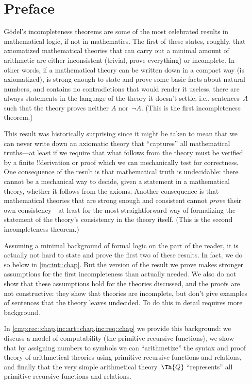 
\chapter{Preface}

G\"odel's incompleteness theorems are some of the most celebrated
results in mathematical logic, if not in mathematics. The first of
these states, roughly, that axiomatized mathematical theories that can
carry out a minimal amount of arithmetic are either inconsistent
(trivial, prove everything) or incomplete. In other words, if a
mathematical theory can be written down in a compact way (is
axiomatized), is strong enough to state and prove some basic facts
about natural numbers, and contains no contradictions that would
render it useless, there are always statements in the language of the
theory it doesn't settle, i.e., sentences~$A$ such that the theory
proves neither $A$ nor~$\lnot A$. (This is the first incompleteness
theorem.)

This result was historically surprising since it might be
taken to mean that we can never write down an axiomatic theory that
``captures'' all mathematical truths---at least if we require that
what follows from the theory must be verified by a finite !!{derivation}
or proof which we can mechanically test for correctness. One
consequence of the result is that mathematical truth is undecidable:
there cannot be a mechanical way to decide, given a statement in a
mathematical theory, whether it follows from the axioms. Another
consequence is that mathematical theories that are strong enough and
consistent cannot \emph{prove} their own consistency---at least for
the most straightforward way of formalizing the statement of the
theory's consistency in the theory itself. (This is the second
incompleteness theorem.)

Assuming a minimal background of formal logic on the part of the
reader, it is actually not hard to state and prove the first two of
these results. In fact, we do so below in \cref{inc:int::chap}. But
the version of the result we prove makes stronger assumptions for the
first incompleteness than actually needed. We also do not show that
these assumptions hold for the theories discussed, and the proofs are
not constructive: they show that theories are incomplete, but don't
give examples of sentences that the theory leaves undecided. To do
this in detail requires more background.

In \cref{cmp:rec::chap,inc:art::chap,inc:req::chap} we provide this
background: we discuss a model of computability (the primitive
recursive functions), we show that by assigning numbers to symbols we
can ``arithmetize'' the syntax and proof theory of arithmetical
theories using primitive recursive functions and relations, and
finally that the very simple arithmetical theory~$\Th{Q}$
``represents'' all primitive recursive functions and relations.

